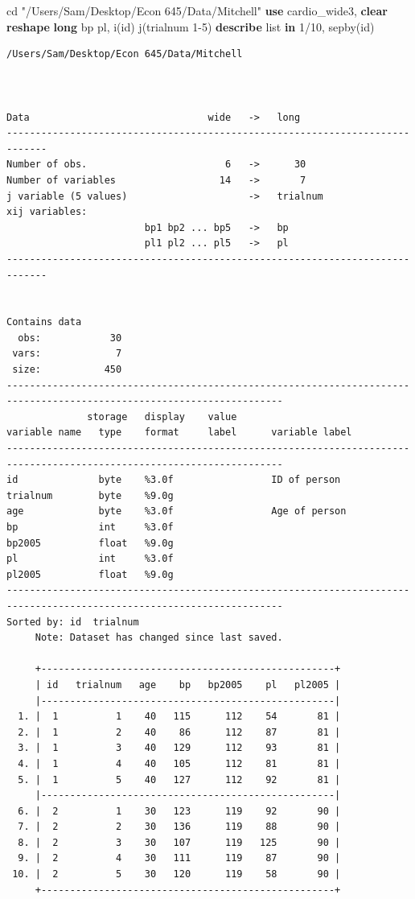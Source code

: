 \documentclass[
]{book}
\newenvironment{Shaded}{\begin{snugshade}}{\end{snugshade}}
\newcommand{\KeywordTok}[1]{\textcolor[rgb]{0.13,0.29,0.53}{\textbf{#1}}}
\newcommand{\NormalTok}[1]{#1}
\newcommand{\OtherTok}[1]{\textcolor[rgb]{0.56,0.35,0.01}{#1}}
\newcommand{\StringTok}[1]{\textcolor[rgb]{0.31,0.60,0.02}{#1}}
\begin{document}
\begin{Shaded}
\begin{Highlighting}[]
\NormalTok{cd }\StringTok{"/Users/Sam/Desktop/Econ 645/Data/Mitchell"}
\KeywordTok{use}\NormalTok{ cardio\_wide3, }\KeywordTok{clear}
\KeywordTok{reshape} \KeywordTok{long}\NormalTok{ bp pl, i(id) j(trialnum 1{-}5)}
\KeywordTok{describe}
\OtherTok{list} \KeywordTok{in}\NormalTok{ 1/10, sepby(id)}
\end{Highlighting}
\end{Shaded}

\begin{verbatim}
/Users/Sam/Desktop/Econ 645/Data/Mitchell



Data                               wide   ->   long
-----------------------------------------------------------------------------
Number of obs.                        6   ->      30
Number of variables                  14   ->       7
j variable (5 values)                     ->   trialnum
xij variables:
                        bp1 bp2 ... bp5   ->   bp
                        pl1 pl2 ... pl5   ->   pl
-----------------------------------------------------------------------------


Contains data
  obs:            30                          
 vars:             7                          
 size:           450                          
----------------------------------------------------------------------------------------------------------------------
              storage   display    value
variable name   type    format     label      variable label
----------------------------------------------------------------------------------------------------------------------
id              byte    %3.0f                 ID of person
trialnum        byte    %9.0g                 
age             byte    %3.0f                 Age of person
bp              int     %3.0f                 
bp2005          float   %9.0g                 
pl              int     %3.0f                 
pl2005          float   %9.0g                 
----------------------------------------------------------------------------------------------------------------------
Sorted by: id  trialnum
     Note: Dataset has changed since last saved.

     +---------------------------------------------------+
     | id   trialnum   age    bp   bp2005    pl   pl2005 |
     |---------------------------------------------------|
  1. |  1          1    40   115      112    54       81 |
  2. |  1          2    40    86      112    87       81 |
  3. |  1          3    40   129      112    93       81 |
  4. |  1          4    40   105      112    81       81 |
  5. |  1          5    40   127      112    92       81 |
     |---------------------------------------------------|
  6. |  2          1    30   123      119    92       90 |
  7. |  2          2    30   136      119    88       90 |
  8. |  2          3    30   107      119   125       90 |
  9. |  2          4    30   111      119    87       90 |
 10. |  2          5    30   120      119    58       90 |
     +---------------------------------------------------+
\end{verbatim}
\end{document}
